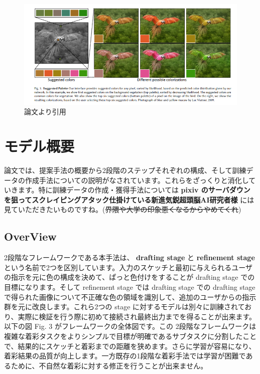 \documentclass[a4paper, dvipdfmx, 10pt]{article}
\begin{document}
\begin{itemize}
\begin{figure}[htbp]
\centering
\includegraphics[width=.9\linewidth]{./img/rtugi_abst.PNG}
\caption{論文より引用}
\end{figure}
\end{itemize}

\section{モデル概要}
\label{sec:org00ba3dc}
論文では、提案手法の概要から2段階のステップそれぞれの構成、そして訓練データの作成手法についての説明がなされています。これらをざっくりと消化していきます。特に訓練データの作成・獲得手法については \textbf{pixiv のサーバダウンを狙ってスクレイピングアタック仕掛けている新進気鋭超頭脳AI研究者様} には見ていただきたいものですね。(\sout{界隈や大学の印象悪くなるからやめてくれ})\\

\subsection{OverView}
\label{sec:orgffcb23d}
2段階なフレームワークである本手法は、 \textbf{drafting stage} と \textbf{refinement stage} という名前で2つを区別しています。入力のスケッチと最初に与えられるユーザの指示を元に色の構成を決めて、ぱっと色付けをすることが drafting stage での目標になります。そして refinement stage では drafting stage での drafting stage で得られた画像について不正確な色の領域を識別して、追加のユーザからの指示群を元に改良します。これら2つの stage に対するモデルは別々に訓練されており、実際に検証を行う際に初めて接続され最終出力までを得ることが出来ます。以下の図 Fig. 3 がフレームワークの全体図です。この 2段階なフレームワークは複雑な着彩タスクをよりシンプルで目標が明確であるサブタスクに分割したことで、結果的にスケッチと着彩までの距離を狭めます。さらに学習が容易になり、着彩結果の品質が向上します。一方既存の1段階な着彩手法では学習が困難であるために、不自然な着彩に対する修正を行うことが出来ません。\\
\end{document}
